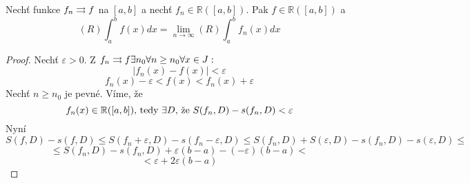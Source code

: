 \begin{vetal}
Nechť funkce $f_n \rightrightarrows f$ na $[a,b]$ a nechť $f_n \in \mathbb{R} ([a,b])$. Pak $f \in \mathbb{R}([a,b])$ a 
$$(R) \int_a^b f(x) dx = \lim_{n \rightarrow \infty} (R) \int_a^b f_n(x) dx$$
\end{vetal}
\begin{proof}
Nechť $\varepsilon > 0$. Z $f_n \rightrightarrows f \exists n_0 \forall n \geq n_0 \forall x \in J:$
$$|f_n(x) - f(x)| < \varepsilon$$
$$f_n(x) - \varepsilon < f(x) < f_n(x) + \varepsilon$$
Nechť $n \geq n_0$ je pevné. Víme, že 
$$\hbox{$f_n(x) \in \mathbb{R}([a,b])$, tedy $\exists D$, že $S(f_n,D) - s(f_n,D)<\varepsilon$}$$
Nyní
$$S(f,D) - s(f,D) \leq S(f_n+\varepsilon, D) - s(f_n-\varepsilon,D) \leq S(f_n,D)+S(\varepsilon,D) - s(f_n,D) - s(\varepsilon,D) \leq $$ 
$$ \leq S(f_n,D) - s(f_n,D) +\varepsilon(b-a) - (-\varepsilon)(b-a) <$$
$$< \varepsilon +2\varepsilon(b-a)$$
\end{proof}

